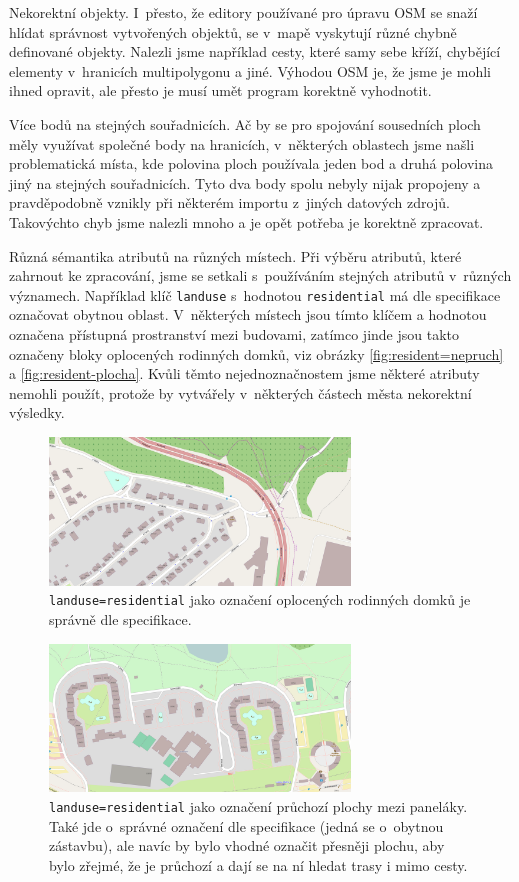 \smallskip
{\tuc Nekorektní objekty.} I~přesto, že editory používané pro úpravu OSM se snaží
hlídat správnost vytvořených objektů, se v~mapě vyskytují různé chybně
definované objekty. Nalezli jsme například cesty, které samy sebe kříží,
chybějící elementy v~hranicích multipolygonu a jiné. Výhodou OSM je, že jsme je
mohli ihned opravit, ale přesto je musí umět program korektně vyhodnotit.

\smallskip
{\tuc Více bodů na stejných souřadnicích.} Ač by se pro spojování sousedních
ploch měly využívat společné body na hranicích, v~některých oblastech jsme našli
problematická místa, kde polovina ploch používala jeden bod a druhá polovina
jiný na stejných souřadnicích. Tyto dva body spolu nebyly nijak propojeny a
pravděpodobně vznikly při některém importu z~jiných datových zdrojů. Takovýchto
chyb jsme nalezli mnoho a je opět potřeba je korektně zpracovat.

\smallskip
{\tuc Různá sémantika atributů na různých místech.} Při výběru atributů, které
zahrnout ke zpracování, jsme se setkali s~používáním stejných atributů v~různých
významech. Například klíč \verb|landuse| s~hodnotou \verb|residential| má dle
specifikace \cite{osmfeatures} označovat obytnou oblast. V~některých místech
jsou tímto klíčem a hodnotou označena přístupná prostranství mezi budovami,
zatímco jinde jsou takto označeny bloky oplocených rodinných domků, viz obrázky
\ref{fig:resident=nepruch} a \ref{fig:resident-plocha}.
Kvůli těmto nejednoznačnostem jsme některé atributy nemohli použít, protože by
vytvářely v~některých částech města nekorektní výsledky.
\begin{figure}
	\centering
	\includegraphics[width=80mm]{../img/resident-nepruch.pdf}
	\caption{\texttt{landuse=residential} jako označení oplocených rodinných
	domků je správně dle specifikace.}
	\label{fig:resident-nepruch}
\end{figure}
\begin{figure}
	\centering
	\includegraphics[width=80mm]{../img/resident-plocha.pdf}
	\caption{\texttt{landuse=residential} jako označení průchozí plochy mezi
	paneláky. Také jde o~správné označení dle specifikace (jedná se
o~obytnou zástavbu), ale navíc by bylo vhodné označit přesněji plochu, aby
	bylo zřejmé, že je průchozí a dají se na ní hledat trasy i mimo cesty.}
	\label{fig:resident-volno}
\end{figure}

